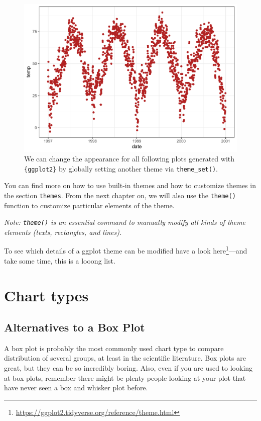 \documentclass[
]{krantz}
\renewcommand{\href}[2]{#2\footnote{\url{#1}}}
\begin{document}
\begin{figure}
\centering
\includegraphics{bookdown_files/figure-latex/remove-gray-background-1.pdf}
\caption{\label{fig:remove-gray-background}We can change the appearance for all following plots generated with \texttt{\{ggplot2\}} by globally setting another theme via \texttt{theme\_set()}.}
\end{figure}

You can find more on how to use built-in themes and how to customize themes in the section \texttt{themes}. From the next chapter on, we will also use the \texttt{theme()} function to customize particular elements of the theme.

\emph{Note: \texttt{theme()} is an essential command to manually modify all kinds of theme elements (texts, rectangles, and lines).}

To see which details of a ggplot theme can be modified have a look \href{https://ggplot2.tidyverse.org/reference/theme.html}{here}---and take some time, this is a looong list.

\hypertarget{charts}{%
\chapter{Chart types}\label{charts}}

\hypertarget{alternatives-to-a-box-plot}{%
\section{Alternatives to a Box Plot}\label{alternatives-to-a-box-plot}}

A box plot is probably the most commonly used chart type to compare distribution of several groups, at least in the scientific literature. Box plots are great, but they can be so incredibly boring. Also, even if you are used to looking at box plots, remember there might be plenty people looking at your plot that have never seen a box and whisker plot before.
\end{document}
